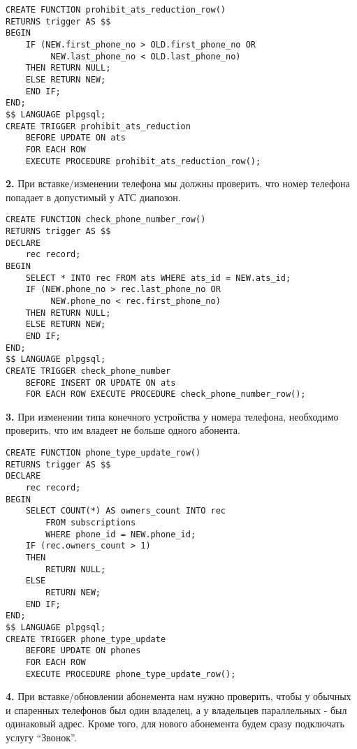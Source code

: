 \documentclass{report}
\begin{document}
\begin{lstlisting}
CREATE FUNCTION prohibit_ats_reduction_row()
RETURNS trigger AS $$
BEGIN
    IF (NEW.first_phone_no > OLD.first_phone_no OR
         NEW.last_phone_no < OLD.last_phone_no)
    THEN RETURN NULL;
    ELSE RETURN NEW;
    END IF;
END;
$$ LANGUAGE plpgsql;
CREATE TRIGGER prohibit_ats_reduction 
    BEFORE UPDATE ON ats
    FOR EACH ROW
    EXECUTE PROCEDURE prohibit_ats_reduction_row();
\end{lstlisting}

\textbf{2.} При вставке/изменении телефона мы должны проверить, 
что номер телефона попадает в допустимый у АТС диапозон.

\begin{lstlisting}
CREATE FUNCTION check_phone_number_row()
RETURNS trigger AS $$
DECLARE
    rec record;
BEGIN
    SELECT * INTO rec FROM ats WHERE ats_id = NEW.ats_id;
    IF (NEW.phone_no > rec.last_phone_no OR
         NEW.phone_no < rec.first_phone_no)
    THEN RETURN NULL;
    ELSE RETURN NEW;
    END IF;
END;
$$ LANGUAGE plpgsql;
CREATE TRIGGER check_phone_number 
    BEFORE INSERT OR UPDATE ON ats
    FOR EACH ROW EXECUTE PROCEDURE check_phone_number_row();
\end{lstlisting}

\textbf{3.} При изменении типа конечного устройства у номера телефона, 
необходимо проверить, что им владеет не больше одного абонента.

\begin{lstlisting}
CREATE FUNCTION phone_type_update_row()
RETURNS trigger AS $$
DECLARE
    rec record;
BEGIN
    SELECT COUNT(*) AS owners_count INTO rec 
        FROM subscriptions
        WHERE phone_id = NEW.phone_id;
    IF (rec.owners_count > 1)
    THEN
        RETURN NULL;
    ELSE
        RETURN NEW;
    END IF;
END;
$$ LANGUAGE plpgsql;
CREATE TRIGGER phone_type_update 
    BEFORE UPDATE ON phones
    FOR EACH ROW 
    EXECUTE PROCEDURE phone_type_update_row();
\end{lstlisting}

\textbf{4.} При вставке/обновлении абонемента нам нужно проверить, 
чтобы у обычных и спаренных телефонов был один владелец, 
а у владельцев параллельных - был одинаковый адрес. 
Кроме того, для нового абонемента
будем сразу подключать услугу ``Звонок''.
\end{document}
